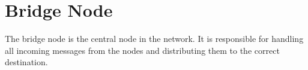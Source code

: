 \section{Bridge Node} 
The bridge node is the central node in the network. It is responsible for
handling all incoming messages from the nodes and distributing them to the
correct destination.

